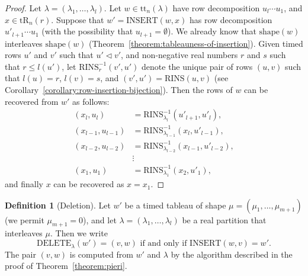 \documentclass[10pt]{amsproc}
\theoremstyle{definition}
\newtheorem{definition}[theorem]{Definition}
\theoremstyle{remark}
\newcommand{\rowins}{\mathrm{RINS}}
\newcommand{\ins}{\mathrm{INSERT}}
\newcommand{\del}{\mathrm{DELETE}}
\newcommand{\shape}{\mathrm{shape}}
\newcommand{\ttab}{\mathrm{tt}}
\newcommand{\tr}{\mathrm{tR}}
\begin{document}
\begin{proof}
  Let $\lambda=(\lambda_1,\dotsc,\lambda_l)$.
  Let $w\in \ttab_n(\lambda)$ have row decomposition $u_l\dotsb u_1$, and $x\in \tr_n(r)$.
  Suppose that $w'=\ins(w,x)$ has row decomposition $u'_{l+1}\dotsb u_1$ (with the possibility that $u_{l+1}=\emptyset$).
  We already know that $\shape(w)$ interleaves $\shape(w)$ (Theorem~\ref{theorem:tableauness-of-insertion}).
  Given timed rows $u'$ and $v'$ such that $u'\lhd v'$, and non-negative real numbers $r$ and $s$ such that $r\leq l(u')$, let $\rowins^{-1}_r(v',u')$ denote the unique pair of rows $(u,v)$ such that $l(u)=r$, $l(v)=s$, and $(v',u')=\rowins(u,v)$ (see Corollary~\ref{corollary:row-insertion-bijection}).
  Then the rows of $w$ can be recovered from $w'$ as follows:
  \begin{align*}
    (x_l, u_l) & = \rowins^{-1}_{\lambda_l}(u'_{l+1},u'_l),\\
    (x_{l-1},u_{l-1}) & = \rowins^{-1}_{\lambda_{l-1}}(x_l,u'_{l-1}),\\
    (x_{l-2},u_{l-2}) & = \rowins^{-1}_{\lambda_{l-2}}(x_{l-1},u'_{l-2}),\\
    &\vdots\\
    (x_1,u_1) & = \rowins^{-1}_{\lambda_1}(x_2,u'_1),
  \end{align*}
  and finally $x$ can be recovered as $x=x_1$.
\end{proof}
\begin{definition}
  [Deletion]
  \label{definition:deletion}
  Let $w'$ be a timed tableau of shape \linebreak $\mu=(\mu_1,\dotsc,\mu_{m+1})$ (we permit $\mu_{m+1}=0$), and let $\lambda=(\lambda_1,\dotsc,\lambda_l)$ be a real partition that interleaves $\mu$.
  Then we write
  \begin{displaymath}
    \del_\lambda(w')=(v,w) \text{ if and only if } \ins(w,v)=w'.
  \end{displaymath}
  The pair $(v,w)$ is computed from $w'$ and $\lambda$ by the algorithm described in the proof of Theorem~\ref{theorem:pieri}.
\end{definition}
\end{document}
